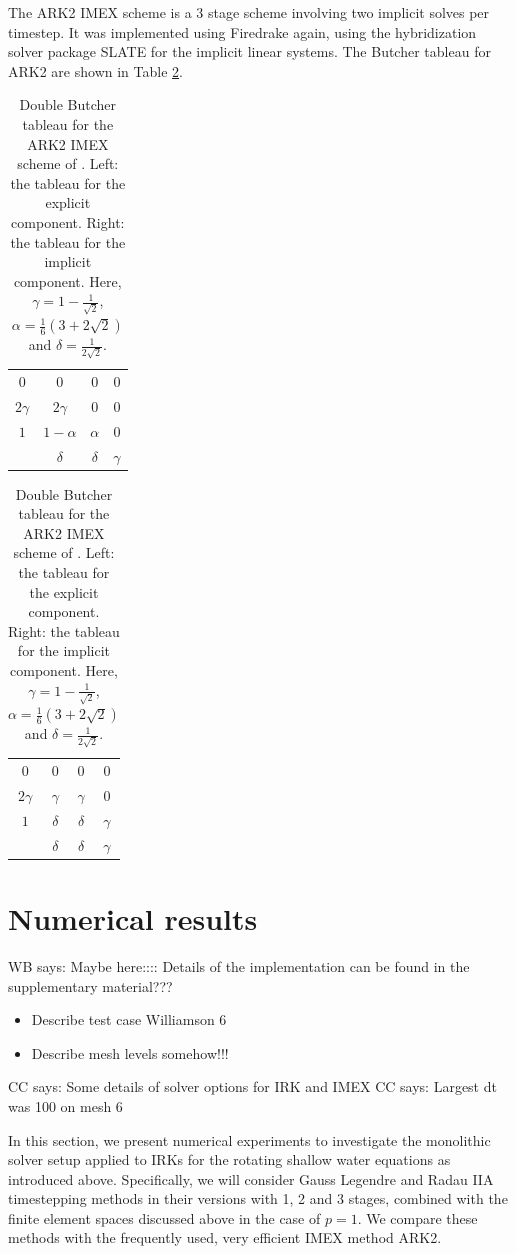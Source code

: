 \documentclass[a4paper, 12pt]{article}
\newcommand{\werner}[1]{{\color{magenta}WB says: #1}}
\newcommand{\colin}[1]{{\color{blue}CC says: #1}}
\begin{document}
The ARK2 IMEX scheme is a 3 stage scheme involving two implicit solves
per timestep. It was implemented using Firedrake again, using the
hybridization solver package SLATE \citep{gibson2020slate} for the
implicit linear systems. The Butcher tableau for ARK2 are shown in Table
\ref{tab:ARK2}.

\begin{table}\centering
\begin{tabular}{c|ccc}
0         &  0             &   0       & 0  \\
$2\gamma$ &  $2\gamma$     &  0        & 0  \\
$1$       & $1 - \alpha$   & $\alpha$  & 0  \\ \hline
          & $\delta$       & $\delta$  & $\gamma$
\end{tabular}
\hspace{4mm}
\begin{tabular}{c|ccc}
0         &  0             &   0       & 0  \\
$2\gamma$ &  $\gamma$     &  $\gamma$        & 0  \\
$1$       & $\delta $   & $\delta$  & $\gamma$  \\ \hline
          & $\delta$       & $\delta$  & $\gamma$
\end{tabular}
\caption{\label{tab:ARK2}Double Butcher tableau for the ARK2 IMEX scheme of
  \citet{giraldo2013implicit}. Left: the tableau for the explicit component.
  Right: the tableau for the implicit component.
   Here, $\gamma = 1 -
  \frac{1}{\sqrt{2}}$, $\alpha = \frac{1}{6} (3 + 2\sqrt{2})$ and
  $\delta = \frac{1}{ 2 \sqrt{2}}$.}
\end{table}

\section{Numerical results}


\werner{Maybe here:::: Details of the implementation can be found in the supplementary material???}

\begin{itemize}
 \item Describe test case Williamson 6
 \item Describe mesh levels somehow!!!
\end{itemize}

\colin{Some details of solver options for IRK and IMEX}
\colin{Largest dt was 100 on mesh 6}

In this section, we present numerical experiments to investigate the
monolithic solver setup applied to IRKs for the rotating shallow water
equations as introduced above. Specifically, we will consider Gauss
Legendre and Radau IIA timestepping methods in their versions with 1,
2 and 3 stages, combined with the finite element spaces discussed
above in the case of $p=1$. We compare these methods with the
frequently used, very efficient IMEX method ARK2.
\end{document}
